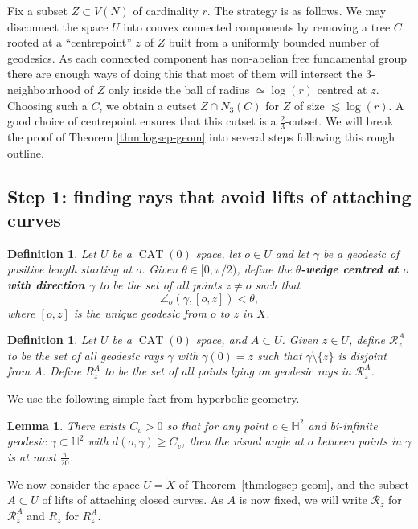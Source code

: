 \documentclass[11pt]{amsart}
\numberwithin{equation}{section}
\newtheorem{lemma}[equation]{Lemma}
\newtheorem{definition}[equation]{Definition}
\theoremstyle{citing}
\DeclareMathOperator{\CAT}{CAT}
\newcommand{\HH}{\mathbb{H}}
\numberwithin{equation}{section}
\begin{document}
Fix a subset $Z\subset V(N)$ of cardinality $r$. The strategy is as follows. We may disconnect the space $U$ into convex connected components by removing a tree $C$ rooted at a ``centrepoint'' $z$ of $Z$ built from a uniformly bounded number of geodesics. As each connected component has non-abelian free fundamental group there are enough ways of doing this that most of them will intersect the $3$-neighbourhood of $Z$ only inside the ball of radius $\simeq\log(r)$ centred at $z$. Choosing such a $C$, we obtain a cutset $Z\cap N_3(C)$ for $Z$ of size $\lesssim \log(r)$. A good choice of centrepoint ensures that this cutset is a $\frac23$-cutset. We will break the proof of Theorem \ref{thm:logsep-geom} into several steps following this rough outline.

\subsection*{Step 1: finding rays that avoid lifts of attaching curves}

\begin{definition} Let $U$ be a $\CAT(0)$ space, let $o\in U$ and let $\gamma$ be a geodesic of positive length starting at $o$. Given $\theta\in[0,\pi/2)$, define the \textbf{$\theta$-wedge centred at $o$ with direction $\gamma$} to be the set of all points $z\neq o$ such that
\[
 \angle_o(\gamma,[o,z]) < \theta,
\]
where $[o,z]$ is the unique geodesic from $o$ to $z$ in $X$.
\end{definition}

\begin{definition} Let $U$ be a $\CAT(0)$ space, and $A \subset U$. Given $z\in U$, define $\mathcal R^A_z$ to be the set of all geodesic rays $\gamma$ with $\gamma(0)=z$ such that $\gamma\setminus\{z\}$ is disjoint from $A$. Define $R^A_z$ to be the set of all points lying on geodesic rays in $\mathcal R^A_z$.
\end{definition}

We use the following simple fact from hyperbolic geometry.
\begin{lemma}
	\label{lem:hyp-visual-angle}
	There exists $C_v >0$ so that for any point $o \in \HH^2$ and bi-infinite geodesic $\gamma \subset \HH^2$ with $d(o,\gamma) \geq C_v$, then the visual angle at $o$ between points in $\gamma$ is at most $\frac{\pi}{20}$.
\end{lemma}

We now consider the space $U = \widetilde{X}$ of Theorem~\ref{thm:logsep-geom}, and the subset $A \subset U$ of lifts of attaching closed curves. As $A$ is now fixed, we will write $\mathcal R_z$ for $\mathcal R_z^A$ and $R_z$ for $R_z^A$.
\end{document}
